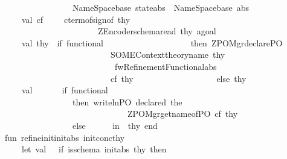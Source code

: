 \begin{isabellebody}
\ \ \ \ \ \ \ \ \ \ \ \ \ \ \ \ \ \ \ {\isacharparenleft}NameSpace{\isachardot}base\ state{\isacharunderscore}abs{\isacharparenright}{\isacharcircum}{\isachardoublequote}\ {\isacharat}\ {\isachardoublequote}{\isacharcircum}{\isacharparenleft}NameSpace{\isachardot}base\ abs{\isacharparenright}{\isacharcircum}{\isachardoublequote}{\isacharparenright}{\isachardoublequote}{\isacharsemicolon}\isanewline
\ \ \ \ \ \ \ val\ cf\ \ \ {\isacharequal}\ \ cterm{\isacharunderscore}of{\isacharparenleft}sign{\isacharunderscore}of\ thy{\isacharprime}{\isacharparenright}\isanewline
\ \ \ \ \ \ \ \ \ \ \ \ \ \ \ \ \ \ \ \ \ \ \ \ \ {\isacharparenleft}ZEncoder{\isachardot}schema{\isacharunderscore}read\ thy{\isacharprime}\ agoal{\isacharparenright}\isanewline
\isanewline
\ \ \ \ \ \ \ val\ thy{\isacharprime}{\isacharprime}{\isacharequal}\ \ if\ functional\ \isanewline
\ \ \ \ \ \ \ \ \ \ \ \ \ \ \ \ \ \ \ then\ ZPO{\isacharunderscore}Mgr{\isachardot}declare{\isacharunderscore}PO\ \isanewline
\ \ \ \ \ \ \ \ \ \ \ \ \ \ \ \ \ \ \ \ \ \ \ \ \ \ \ \ {\isacharparenleft}SOME{\isacharparenleft}Context{\isachardot}theory{\isacharunderscore}name\ thy{\isacharprime}{\isacharparenright}{\isacharcomma}\isanewline
\ \ \ \ \ \ \ \ \ \ \ \ \ \ \ \ \ \ \ \ \ \ \ \ \ \ \ \ \ {\isachardoublequote}fwRefinementFunctional{\isachardoublequote}{\isacharcomma}abs{\isacharparenright}\ \isanewline
\ \ \ \ \ \ \ \ \ \ \ \ \ \ \ \ \ \ \ \ \ \ \ \ \ \ \ \ cf\ thy{\isacharprime}\isanewline
\ \ \ \ \ \ \ \ \ \ \ \ \ \ \ \ \ \ \ else\ thy{\isacharprime}\isanewline
\ \ \ \ \ \ \ val\ {\isacharunderscore}\ {\isacharequal}\ \ \ \ \ if\ functional\isanewline
\ \ \ \ \ \ \ \ \ \ \ \ \ \ \ \ \ \ \ then\ writeln{\isacharparenleft}{\isachardoublequote}PO\ declared{\isacharcolon}\ {\isachardoublequote}{\isacharcircum}{\isacharparenleft}the\isanewline
\ \ \ \ \ \ \ \ \ \ \ \ \ \ \ \ \ \ \ \ \ \ \ \ \ \ \ \ \ \ \ \ {\isacharparenleft}ZPO{\isacharunderscore}Mgr{\isachardot}get{\isacharunderscore}name{\isacharunderscore}of{\isacharunderscore}PO\ cf\ thy{\isacharprime}{\isacharprime}{\isacharparenright}{\isacharparenright}{\isacharparenright}\isanewline
\ \ \ \ \ \ \ \ \ \ \ \ \ \ \ \ \ \ \ else\ {\isacharparenleft}{\isacharparenright}\isanewline
\ \isanewline
\ \ \ in\ \ thy{\isacharprime}{\isacharprime}\ end\isanewline
\isanewline
\ \ \ fun\ refine{\isacharunderscore}init{\isacharparenleft}init{\isacharunderscore}abs{\isacharcomma}\ init{\isacharunderscore}conc{\isacharparenright}{\isacharparenleft}thy{\isacharparenright}\ {\isacharequal}\isanewline
\ \ \ \ \ \ \ let\ val\ {\isacharunderscore}\ {\isacharequal}\ if\ is{\isacharunderscore}schema\ init{\isacharunderscore}abs\ thy\ then\ {\isacharparenleft}{\isacharparenright}\isanewline

\end{isabellebody}
